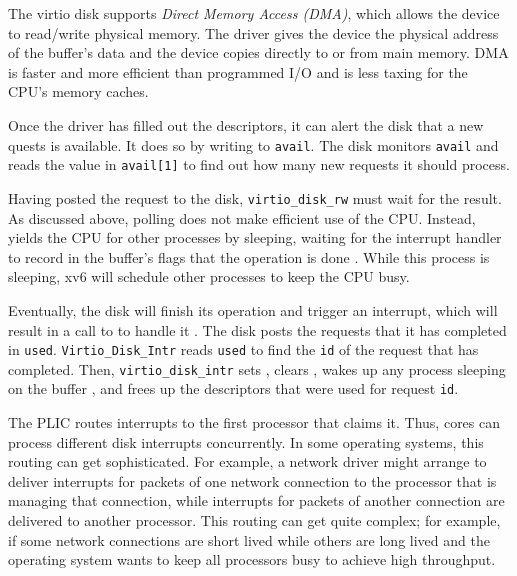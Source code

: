 The virtio disk supports \textit{Direct Memory Access
  (DMA)}, which allows the device to read/write physical
memory.  The driver gives the device the physical address of the
buffer's data  and the device
copies directly to or from main memory.  DMA is faster and more
efficient than programmed I/O and is less taxing for the CPU's memory
caches.

Once the driver has filled out the descriptors, it can alert the disk
that a new quests is available.  It does so by writing to
\lstinline{avail}.  The disk monitors \lstinline{avail} and reads the
value in \lstinline{avail[1]} to find out how many new requests it
should process.

Having posted the request to the disk,
\lstinline{virtio_disk_rw}
must wait for the result.  As discussed above,
polling does not make efficient use of the CPU.
Instead,
yields the CPU for other processes by sleeping,
waiting for the interrupt handler to 
record in the buffer's flags that the operation is done
.
While this process is sleeping,
xv6 will schedule other processes to keep the CPU busy.

Eventually, the disk will finish its operation and trigger an
interrupt, which will result in a call to
to handle it
.
The disk posts the requests that it has completed in \lstinline{used}.
\lstinline{Virtio_Disk_Intr}
reads \lstinline{used} to find the \lstinline{id} of
the request that has completed.
Then, \lstinline{virtio_disk_intr}
sets 
,
clears
,
wakes up any process sleeping on the buffer
,
and frees up the descriptors that were used for request \lstinline{id}.

The PLIC routes interrupts to the first processor that claims it.
Thus, cores can process different disk interrupts concurrently.  In
some operating systems, this routing can get sophisticated.  For
example, a network driver might arrange to deliver interrupts for
packets of one network connection to the processor that is managing
that connection, while interrupts for packets of another connection
are delivered to another processor.  This routing can get quite
complex; for example, if some network connections are short lived
while others are long lived and the operating system wants to keep all
processors busy to achieve high throughput.

